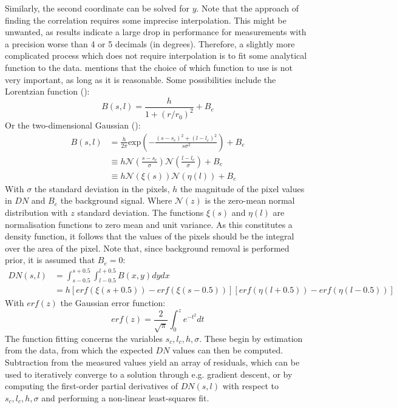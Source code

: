 Similarly, the second coordinate can be solved for $y$. Note that the approach of finding the correlation requires some imprecise interpolation. This might be unwanted, as \cite{veryshortarcs} results indicate a large drop in performance for measurements with a precision worse than 4 or 5 decimals (in degrees). Therefore, a slightly more complicated process which does not require interpolation is to fit some analytical function to the data. \cite{OpNav} mentions that the choice of which function to use is not very important, as long as it is reasonable. Some possibilities include the Lorentzian function (\cite{lorentzian}):
\begin{equation}
    B(s, l) = \frac{h}{1+(r / r_0)^2} + B_e
\end{equation}
Or the two-dimensional Gaussian (\cite{OpNav}):
\begin{align}
    B(s,l) &= \frac{h}{2\pi} \mathrm{exp}\left(-\frac{(s-s_c)^2 + (l-l_c)^2}{s\sigma^2}\right) + B_e \\
    &\equiv h \mathcal{N}\left(\frac{s-s_c}{\sigma}\right) \mathcal{N}\left(\frac{l-l_c}{\sigma}\right) + B_e \\
    &\equiv h \mathcal{N}(\xi(s))\mathcal{N}(\eta(l)) + B_e
\end{align}
With $\sigma$ the standard deviation in the pixels, $h$ the magnitude of the pixel values in $DN$ and $B_e$ the background signal. Where $\mathcal{N}(z)$ is the zero-mean normal distribution with $z$ standard deviation. The functions $\xi(s)$ and $\eta(l)$ are normalisation functions to zero mean and unit variance. As this constitutes a density function, it follows that the values of the pixels should be the integral over the area of the pixel. Note that, since background removal is performed prior, it is assumed that $B_e = 0$:
\begin{align}
    DN(s,l) &= \int_{s-0.5}^{s+0.5} \int_{l-0.5}^{l+0.5} B(x,y)dy dx \\
    &= h\left[erf(\xi(s+0.5)) - erf(\xi(s-0.5))\right]\left[erf(\eta(l+0.5))-erf(\eta(l-0.5))\right]
\end{align}
With $erf(z)$ the Gaussian error function:
\begin{equation}
    erf(z) = \frac{2}{\sqrt{\pi}}\int_0^ze^{-t^2}dt
\end{equation}
The function fitting concerns the variables $s_c, l_c, h, \sigma$. These begin by estimation from the data, from which the expected $DN$ values can then be computed. Subtraction from the measured values yield an array of residuals, which can be used to iteratively converge to a solution through e.g. gradient descent, or by computing the first-order partial derivatives of $DN(s,l)$ with respect to $s_c, l_c,h, \sigma$ and performing a non-linear least-squares fit. \\

